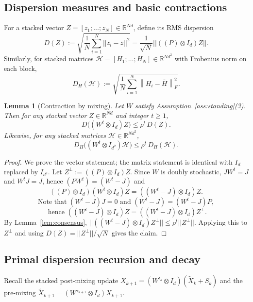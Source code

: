 \documentclass[11pt,a4paper]{article}
\def\one{1}%
\def\J{J}%
\def\Pmat{P}%
\def\norm#1{||#1||}%
\newtheorem{lemma}[theorem]{Lemma}
\newcommand{\R}{\mathbb{R}}
\newcommand{\one}{\mathbf{1}}
\newcommand{\norm}[1]{\left\|#1\right\|}
\newcommand{\normF}[1]{\left\|#1\right\|_F}
\newcommand{\J}{\left(\frac{1}{N}\one\one^\top\right)}
\newcommand{\Pmat}{I-\J}
\begin{document}
	\subsection{Dispersion measures and basic contractions}
	
	For a stacked vector $Z=[z_1;\dots;z_N]\in\R^{Nd}$, define its RMS dispersion
	\[
	D(Z):=\sqrt{\frac1N\sum_{i=1}^N\norm{z_i-\bar z}^2}=\frac{1}{\sqrt N}\norm{((\Pmat)\otimes I_d)Z}.
	\]
	Similarly, for stacked matrices $\mathcal H=[H_1;\dots;H_N]\in\R^{Nd^2}$ with Frobenius norm on each block,
	\[
	D_H(\mathcal H):=\sqrt{\frac1N\sum_{i=1}^N\normF{H_i-\bar H}^2}.
	\]
	
	\begin{lemma}[Contraction by mixing]\label{lem:mix_contract_app}
		Let $W$ satisfy Assumption~\ref{ass:standing}(3). Then for any stacked vector $Z\in\R^{Nd}$ and integer $t\ge 1$,
		\[
		D\big((W^t\otimes I_d)Z\big)\le \rho^t\,D(Z).
		\]
		Likewise, for any stacked matrices $\mathcal H\in\R^{Nd^2}$,
		\[
		D_H\big((W^t\otimes I_{d^2})\mathcal H\big)\le \rho^t\,D_H(\mathcal H).
		\]
	\end{lemma}
	\begin{proof}
		We prove the vector statement; the matrix statement is identical with $I_d$ replaced by $I_{d^2}$.
		Let $Z^\perp:=((\Pmat)\otimes I_d)Z$. Since $W$ is doubly stochastic, $\J W^t=\J$ and $W^t\J=\J$, hence
		$(\Pmat W^t)=(W^t-\J)$ and
		\[
		((\Pmat)\otimes I_d)(W^t\otimes I_d)Z=((W^t-\J)\otimes I_d)Z.
		\]
		\[
		\text{Note that }(W^t-\J)\J=0\text{ and }(W^t-\J)=(W^t-\J)\Pmat,  
		\]
		\[
		\text{ hence }((W^t-\J)\otimes I_d)Z=((W^t-\J)\otimes I_d)Z^\perp.
		\]
		By Lemma~\ref{lem:consensus}, $\norm{((W^t-\J)\otimes I_d)Z^\perp}\le \rho^t\norm{Z^\perp}$.
		Applying this to $Z^\perp$ and using $D(Z)=\norm{Z^\perp}/\sqrt N$ gives the claim.
	\end{proof}
	
	\subsection{Primal dispersion recursion and decay}
	
	Recall the stacked post-mixing update $X_{k+1}=(W^{t_k}\otimes I_d)(\tilde X_k+S_k)$ and the pre-mixing $\tilde X_{k+1}=(W^{\tau_{k+1}}\otimes I_d)X_{k+1}$.
	
\end{document}
